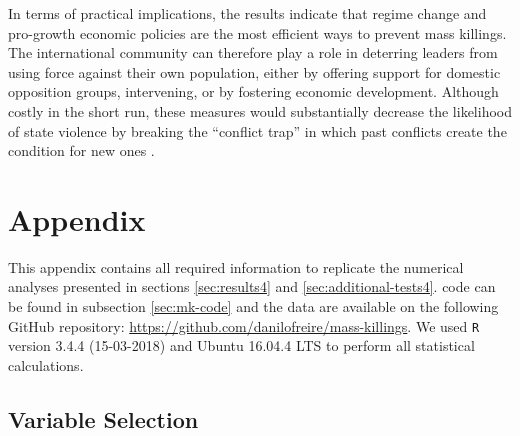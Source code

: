 In terms of practical implications, the results indicate that regime change and pro-growth economic policies are the most efficient ways to prevent mass killings. The international community can therefore play a role in deterring leaders from using force against their own population, either by offering support for domestic opposition groups, intervening, or by fostering economic development. Although costly in the short run, these measures would substantially decrease the likelihood of state violence by breaking the ``conflict trap'' in which past conflicts create the condition for new ones \citep{collier2003breaking}. 

\section{Appendix} 
\label{sec:mk-appendix}

This appendix contains all required information to replicate the numerical analyses presented in sections \ref{sec:results4} and \ref{sec:additional-tests4}.  code can be found in subsection \ref{sec:mk-code} and the data are available on the following GitHub repository: \href{https://github.com/danilofreire/mass-killings}{https://github.com/danilofreire/mass-killings}. We used \texttt{R} version 3.4.4 (15-03-2018) and Ubuntu 16.04.4 LTS to perform all statistical calculations.

\subsection{Variable Selection}
\label{sec:mk-vs}

